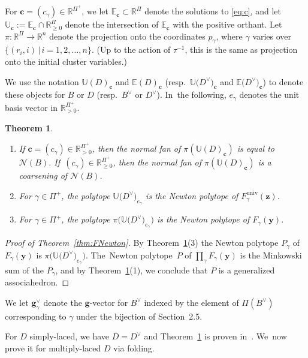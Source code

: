 \documentclass[pdftex]{sigma}%
\def\R{{\mathbb R}}
\def\univ{{\operatorname{univ}}}
\def\E{{\mathbb E}}
\def\U{{\mathbb U}}
\def\z{{\mathbf z}}
\def\y{{\mathbf y}}
\def\N{{\mathcal{N}}}
\def\g{{\mathbf g}}
\def\c{{\mathbf c}}
\numberwithin{equation}{section}
\newtheorem{Theorem}{Theorem}[section]
\begin{document}
For $\c=(c_\gamma) \in \R^{\Pi^+}$, we let $\E_\c \subset \R^{\Pi}$ denote the solutions to \eqref{eq:c}, and let $\U_\c := \E_\c \cap \R_{\geq 0}^{\Pi}$ denote the intersection of $\E_\c$ with the positive orthant. Let~$\pi\colon \R^{\Pi} \to \R^n$ denote the projection onto the coordinates $p_\gamma$, where $\gamma$ varies over $\{(r_i,i) \,|\, i=1,2,\dots,n\}$. (Up to the action of $\tau^{-1}$, this is the same as projection onto the initial cluster variables.)

\def\e{{\mathbf e}}
We use the notation $\U(D)_\c$ and $\E(D)_\c$ \big(resp.\ $\U\big(D^\vee\big)_\c$ and $\E\big(D^\vee\big)_\c$\big) to denote these objects for $B$ or $D$ \big(resp.\ $B^\vee$ or $D^\vee$\big). In~the following, $e_\gamma$ denotes the unit basis vector in $\R_{>0}^{\Pi^+}$.

\begin{Theorem}\label{thm:Newt} \
\begin{enumerate}\itemsep=0pt
\item[$1.$]
If $\c=(c_\gamma) \in \R_{>0}^{\Pi^+}$, then the normal fan of $\pi(\U(D)_{\c})$ is equal to $\N(B)$. If~$(c_\gamma) \in \R_{\geq 0}^{\Pi^+}$, then the normal fan of $\pi(\U(D)_{\c})$ is a coarsening of $\N(B)$.
\item[$2.$]
For $\gamma \in \Pi^+$, the polytope $\U\big(D^\vee\big)_{e_\gamma}$ is the Newton polytope of $F^\univ_\gamma(\z)$.
\item[$3.$]
For $\gamma \in \Pi^+$, the polytope $\pi\big(\U\big(D^\vee\big)_{e_\gamma}\big)$ is the Newton polytope of $F_\gamma(\y)$.
\end{enumerate}
\end{Theorem}

\begin{proof}[Proof of Theorem~\ref{thm:FNewton}]
By Theorem~\ref{thm:Newt}(3) the Newton polytope $P_\gamma$ of $F_\gamma(\y)$ is $\pi\big(\U\big(D^\vee\big)_{e_\gamma}\big)$. The~Newton polytope~$P$ of $\prod_\gamma F_\gamma(\y)$ is the Minkowski sum of the $P_\gamma$, and by Theorem~\ref{thm:Newt}(1), we conclude that $P$ is a generalized associahedron.
\end{proof}

We let $\g^\vee_\gamma$ denote the $\g$-vector for $B^\vee$ indexed by the element of $\Pi(B^\vee)$ corresponding to $\gamma$ under the bijection of Section~2.5.

\bigskip{}
For $D$ simply-laced, we have $D = D^\vee$ and Theorem~\ref{thm:Newt} is proven in~\cite{BDMTY}. We~now prove it for multiply-laced $D$ via folding.
\end{document}
